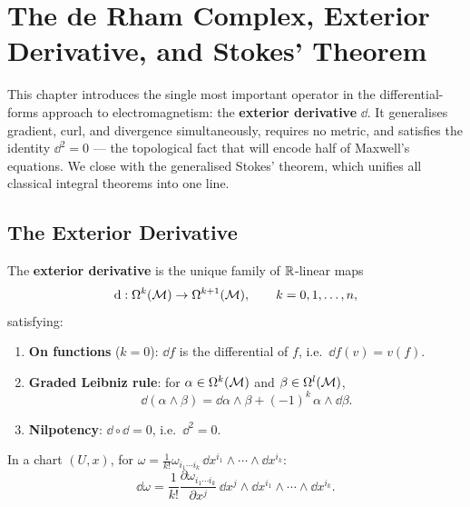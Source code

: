 \chapter{The de Rham Complex, Exterior Derivative, and Stokes' Theorem}

This chapter introduces the single most important operator in the differential-forms approach to electromagnetism: the \textbf{exterior derivative} $\dd$. It generalises gradient, curl, and divergence simultaneously, requires no metric, and satisfies the identity $\dd^2 = 0$ --- the topological fact that will encode half of Maxwell's equations. We close with the generalised Stokes' theorem, which unifies all classical integral theorems into one line.

\section{The Exterior Derivative}

\begin{definition}
The \textbf{exterior derivative} is the unique family of $\mathbb{R}$-linear maps
\begin{equation}
\mathrm{d}: \Omega^k(\mathcal{M}) \to \Omega^{k+1}(\mathcal{M}), \qquad k = 0, 1, \ldots, n,
\end{equation}
satisfying:
\begin{enumerate}
\item \textbf{On functions} ($k=0$): $\dd f$ is the differential of $f$, i.e.\ $\dd f(v) = v(f)$.
\item \textbf{Graded Leibniz rule}: for $\alpha \in \Omega^k(\mathcal{M})$ and $\beta \in \Omega^l(\mathcal{M})$,
\begin{equation}
\dd(\alpha \wedge \beta) = \dd\alpha \wedge \beta + (-1)^k\,\alpha \wedge \dd\beta.
\end{equation}
\item \textbf{Nilpotency}: $\dd \circ \dd = 0$, i.e.\ $\dd^2 = 0$.
\end{enumerate}
\end{definition}

\begin{proposition}
In a chart $(U, x)$, for $\omega = \frac{1}{k!}\omega_{i_1\cdots i_k}\,\dd x^{i_1}\wedge\cdots\wedge\dd x^{i_k}$:
\begin{equation}
\dd\omega = \frac{1}{k!}\frac{\partial \omega_{i_1\cdots i_k}}{\partial x^j}\,\dd x^j \wedge \dd x^{i_1}\wedge\cdots\wedge\dd x^{i_k}.
\end{equation}
\end{proposition}

